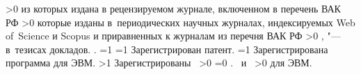{\begin{refsection}
        \ifnum \value{citeauthorvak}>0
             из которых издана в рецензируемом журнале, включенном в перечень ВАК РФ%
        \fi
        \ifnum \value{citeauthorscopuswos}>0%
            которые изданы в~периодических научных журналах, индексируемых Web of~Science и Scopus
            и приравненных к журналам из перечня ВАК РФ%
        \fi%
        \ifnum \value{citeauthorconf}>0%
            ,  "--- в~тезисах докладов.
        \else%
            .
        \fi%
        \ifnum \value{citeregistered}=1%
            \ifnum \value{citeauthorpatent}=1%
                Зарегистрирован  патент.
            \fi%
            \ifnum \value{citeauthorprogram}=1%
                Зарегистрирована  программа для ЭВМ.
            \fi%
        \fi%
        \ifnum \value{citeregistered}>1%
            Зарегистрированы\ %
            \ifnum \value{citeauthorpatent}>0%
                \ifnum \value{citeauthorprogram}=0 . \else \ и~\fi%
            \fi%
            \ifnum \value{citeauthorprogram}>0%
                 для ЭВМ.
            \fi%
        \fi%
    \end{refsection}%
    \begin{refsection}
    \end{refsection}%
}


